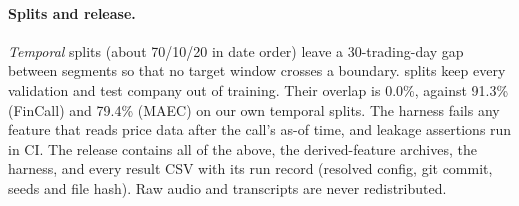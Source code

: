 \paragraph{Splits and release.}
\emph{Temporal} splits (about 70/10/20 in date order) leave a 30-trading-day gap
between segments so that no target window crosses a boundary.
\emph{\tickerdisjoint} splits keep every validation and test company out of
training. Their overlap is 0.0\%, against 91.3\% (FinCall) and 79.4\% (MAEC) on
our own temporal splits. The harness fails any feature that reads price data after
the call's as-of time, and leakage assertions run in CI. The release contains all
of the above, the derived-feature archives, the harness, and every result CSV with
its run record (resolved config, git commit, seeds and file hash). Raw audio and
transcripts are never redistributed.

